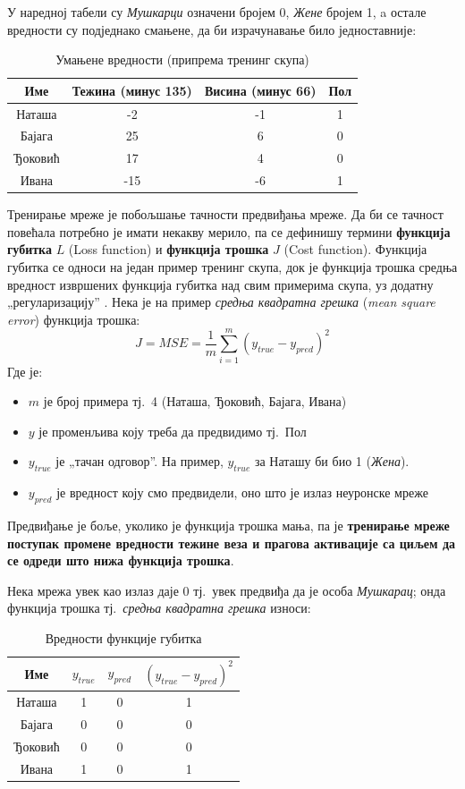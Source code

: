 \documentclass[12pt, а4paper]{article}
\begin{document}
У наредној табели су \textit{Мушкарци} означени бројем 0, \textit{Жене} бројем 1, a
остале вредности су подједнако смањене, да би израчунавање било једноставније:

\begin{table}[H]
\centering
 \begin{tabular}{| c | c | c | c |}
  \hline
  Име & Тежина (минус 135) & Висина (минус 66) & Пол \\
  \hline
  Наташа & -2 & -1 & 1\\
  Бајага & 25 & 6 & 0\\
  Ђоковић & 17 & 4 & 0\\
  Ивана & -15 & -6 & 1\\
  \hline
 \end{tabular}
 \caption{Умањене вредности (припрема тренинг скупа)}
\end{table}


Тренирање мреже је побољшање тачности предвиђања мреже. Да би се тачност повећала потребно
је имати некакву мерило, па се
дефинишу термини \textbf{функција губитка} $L$ (Loss function) и
\textbf{функција трошка} $J$ (Cost function). Функција губитка се односи на један пример тренинг
скупа, док је функција трошка средња вредност извршених функција губитка над свим
примерима скупа, уз додатну „регуларизацију” \cite{stackex_loss}.
\newpage
Нека је на пример \textit{средња квадратна грешка} (\textit{mean square error}) функција трошка:
\begin{equation}
J = MSE = \frac{1}{m} \sum_{i=1}^{m} (y_{true} - y_{pred})^2
\end{equation}
Где је:
\begin{itemize}
 \item $m$ је број примера тј.\ 4 (Наташа, Ђоковић, Бајага, Ивана)
 \item $y$ је променљива коју треба да предвидимо тј.\ Пол
 \item $y_{true}$ је „тачан одговор”. На пример, $y_{true}$ за Наташу би био 1 (\textit{Жена}).
 \item $y_{pred}$ је вредност коју смо предвидели, оно што је излаз неуронске мреже
\end{itemize}

Предвиђање је боље, уколико је функција трошка мања, па је
\textbf{тренирање мреже поступак промене вредности тежине веза и
прагова активације са циљем да се одреди што нижа функција трошка}.

Нека мрежа увек као излаз даје $0$ тј.\ увек предвиђа да је особа \textit{Мушкарац};
онда функција трошка тј.\ \textit{средња квадратна грешка} износи:
\begin{table}[ht]
\centering
 \begin{tabular}{| c | c | c | c |}
  \hline
  Име & $y_{true}$ & $y_{pred}$ & $(y_{true} - y_{pred})^2$ \\
  \hline
  Наташа & 1 & 0 & 1\\
  Бајага & 0 & 0 & 0\\
  Ђоковић & 0 & 0 & 0\\
  Ивана & 1 & 0 & 1\\
  \hline
 \end{tabular}
 \caption{Вредности функције губитка}
 \label{tab:primerSkupa}
\end{table}
\end{document}
